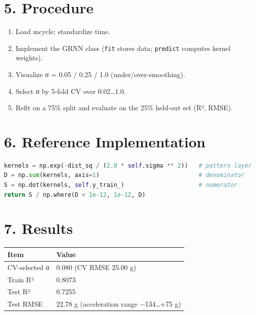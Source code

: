 \section{5. Procedure}\label{procedure}

\begin{enumerate}
\def\labelenumi{\arabic{enumi}.}
\tightlist
\item
  Load mcycle; standardize time.
\item
  Implement the GRNN class (\passthrough{\lstinline!fit!} stores data;
  \passthrough{\lstinline!predict!} computes kernel weights).
\item
  Visualize σ = 0.05 / 0.25 / 1.0 (under/over-smoothing).
\item
  Select σ by 5-fold CV over 0.02\ldots1.0.
\item
  Refit on a 75\% split and evaluate on the 25\% held-out set (R²,
  RMSE).
\end{enumerate}

\section{6. Reference Implementation}\label{reference-implementation}

\begin{lstlisting}[language=Python]
kernels = np.exp(-dist_sq / (2.0 * self.sigma ** 2))   # pattern layer
D = np.sum(kernels, axis=1)                            # denominator
S = np.dot(kernels, self.y_train_)                     # numerator
return S / np.where(D < 1e-12, 1e-12, D)
\end{lstlisting}

\section{7. Results}\label{results}

{\def\LTcaptype{none} %
\begin{longtable}[]{@{}ll@{}}
\toprule\noalign{}
Item & Value \\
\midrule\noalign{}
\endhead
\bottomrule\noalign{}
\endlastfoot
CV-selected σ & 0.080 (CV RMSE 25.00 g) \\
Train R² & 0.8073 \\
Test R² & 0.7255 \\
Test RMSE & 22.78 g (acceleration range −134\ldots+75 g) \\
\end{longtable}
}

